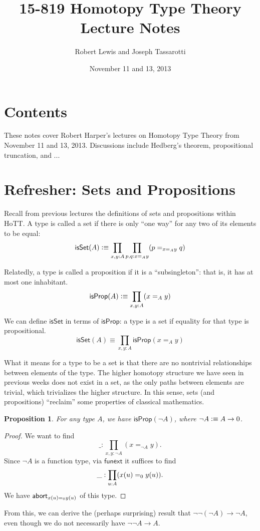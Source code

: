 \documentclass[11pt]{article}
\title{15-819 Homotopy Type Theory\\Lecture Notes}
\author{Robert Lewis and Joseph Tassarotti}
\date{November 11 and 13, 2013}
\newcommand*{\funext}{\mathsf{funext}}
\newcommand*{\isSet}{\mathsf{isSet}}
\newcommand*{\isProp}{\mathsf{isProp}}
\newtheorem{proposition}{Proposition}
\begin{document}
\maketitle

\section{Contents}
These notes cover Robert Harper's lectures on Homotopy Type Theory from
November 11 and 13, 2013. Discussions include Hedberg's theorem, propositional truncation,
and ...


\section{Refresher: Sets and Propositions}
Recall from previous lectures the definitions of sets and propositions within HoTT.
A type is called a set if there is only ``one way'' for any two of its elements to be equal:
$$ \isSet(A) \defeq \prod_{x,y:A}\prod_{p,q: x=_Ay}(p=_{x=_A y}q) $$

Relatedly, a type is called a proposition if it is a ``subsingleton'': that is, it has at most one inhabitant.
$$ \isProp(A) \defeq \prod_{x,y:A}(x=_A y) $$

We can define $\isSet$ in terms of $\isProp$: a type is a set if equality for that type is propositional.
$$ \isSet(A) \equiv \prod_{x,y:A}\isProp(x=_A y) $$

What it means for a type to be a set is that there are no nontrivial relationships between 
elements of the type. The higher homotopy structure we have seen in previous weeks does not exist
in a set, as the only paths between elements are trivial, which trivializes the higher structure.
In this sense, sets (and propositions) ``reclaim'' some properties of classical mathematics.

\begin{proposition}
 For any type $A$, we have $\isProp(\neg A)$, where $\neg A\vcentcolon\equiv A\to 0$.
\end{proposition}
\begin{proof}
 We want to find $$\_:\prod_{x,y:\neg A}(x=_{\neg A} y).$$ Since $\neg A$ is a function type, 
 via $\funext$ it suffices to find $$\_:\prod_{u: A}(x(u) =_0 y(u)).$$ 
 We have $\mathsf{abort}_{x(u)=_0 y(u)}$ of this type.
\end{proof}

From this, we can derive the (perhaps surprising) result that $\neg\neg (\neg A)\to \neg A$,
even though we do not necessarily have $\neg\neg A \to A$.
\end{document}

